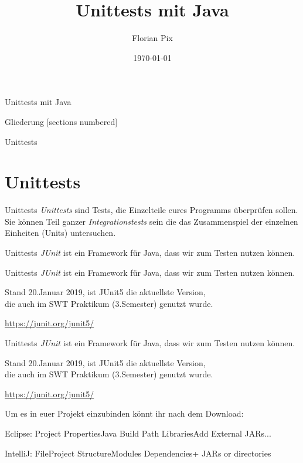 \documentclass[10pt]{beamer}
\author{Florian Pix}
\institute{Java-Kurs}
\title{Unittests mit Java}
\date{\today}
\begin{document}
\begin{frame}{Unittests mit Java}
    \titlepage
\end{frame}

\begin{frame}{Gliederung}
	[sections numbered]
	\tableofcontents
\end{frame}

\begin{frame}[fragile]{Unittests}
    \section{Unittests}
\end{frame}

\begin{frame}[fragile]{Unittests}
    \textit{Unittests} sind Tests, die Einzelteile eures Programms überprüfen sollen. Sie können Teil ganzer \textit{Integrationstests} sein die das Zusammenspiel der einzelnen Einheiten (Units) 		              untersuchen. \\
\end{frame}

\begin{frame}[fragile]{Unittests}
    \textit{JUnit} ist ein Framework für Java, dass wir zum Testen nutzen können. 
\end{frame}

\begin{frame}[fragile]{Unittests}
    \textit{JUnit} ist ein Framework für Java, dass wir zum Testen nutzen können. 

    Stand 20.Januar 2019, ist JUnit5 die aktuellste Version, \\
    die auch im SWT Praktikum (3.Semester) genutzt wurde.

    \url{https://junit.org/junit5/}
\end{frame}

\begin{frame}[fragile]{Unittests}
    \textit{JUnit} ist ein Framework für Java, dass wir zum Testen nutzen können. 

    Stand 20.Januar 2019, ist JUnit5 die aktuellste Version, \\
    die auch im SWT Praktikum (3.Semester) genutzt wurde.

    \url{https://junit.org/junit5/}
    
    Um es in euer Projekt einzubinden könnt ihr nach dem Download:

    Eclipse: Project Properties\rightarrow Java Build Path \newline Libraries\rightarrow Add External JARs... 

    IntelliJ: File\rightarrow Project Structure\rightarrow Modules \newline Dependencies\rightarrow + \rightarrow JARs or directories
\end{frame}
\end{document}

